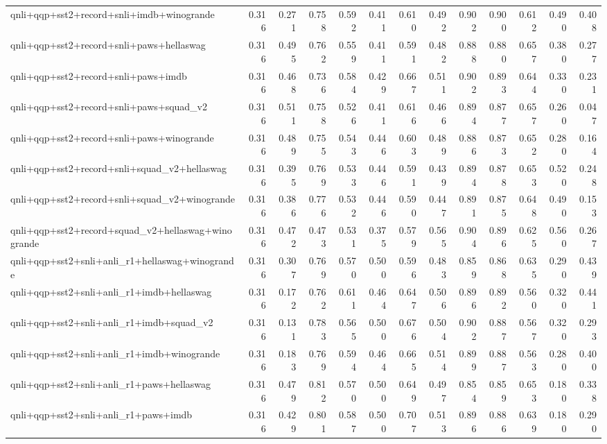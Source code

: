 \begin{table}[t]
\begin{tabular}{lrrrrrrrrrrrr}
    qnli+qqp+sst2+record+snli+imdb+winogrande & 0.316 & 0.271 & 0.758 & 0.592 & 0.411 & 0.610 & 0.492 & 0.902 & 0.900 & 0.612 & 0.490 & 0.408 \\
    qnli+qqp+sst2+record+snli+paws+hellaswag & 0.316 & 0.495 & 0.762 & 0.559 & 0.411 & 0.591 & 0.482 & 0.888 & 0.880 & 0.657 & 0.380 & 0.277 \\
    qnli+qqp+sst2+record+snli+paws+imdb & 0.316 & 0.468 & 0.736 & 0.584 & 0.429 & 0.667 & 0.511 & 0.902 & 0.893 & 0.644 & 0.330 & 0.231 \\
    qnli+qqp+sst2+record+snli+paws+squad\_v2 & 0.316 & 0.511 & 0.758 & 0.526 & 0.411 & 0.616 & 0.466 & 0.894 & 0.877 & 0.657 & 0.260 & 0.047 \\
    qnli+qqp+sst2+record+snli+paws+winogrande & 0.316 & 0.489 & 0.755 & 0.543 & 0.446 & 0.603 & 0.489 & 0.886 & 0.873 & 0.652 & 0.280 & 0.164 \\
    qnli+qqp+sst2+record+snli+squad\_v2+hellaswag & 0.316 & 0.395 & 0.769 & 0.533 & 0.446 & 0.591 & 0.439 & 0.894 & 0.878 & 0.653 & 0.520 & 0.248 \\
    qnli+qqp+sst2+record+snli+squad\_v2+winogrande & 0.316 & 0.386 & 0.776 & 0.532 & 0.446 & 0.590 & 0.447 & 0.891 & 0.875 & 0.648 & 0.490 & 0.153 \\
    qnli+qqp+sst2+record+squad\_v2+hellaswag+winogrande & 0.316 & 0.472 & 0.473 & 0.531 & 0.375 & 0.579 & 0.565 & 0.904 & 0.896 & 0.625 & 0.560 & 0.267 \\
    qnli+qqp+sst2+snli+anli\_r1+hellaswag+winogrande & 0.316 & 0.307 & 0.769 & 0.570 & 0.500 & 0.596 & 0.483 & 0.859 & 0.868 & 0.635 & 0.290 & 0.439 \\
    qnli+qqp+sst2+snli+anli\_r1+imdb+hellaswag & 0.316 & 0.172 & 0.762 & 0.611 & 0.464 & 0.647 & 0.506 & 0.896 & 0.892 & 0.560 & 0.320 & 0.441 \\
    qnli+qqp+sst2+snli+anli\_r1+imdb+squad\_v2 & 0.316 & 0.131 & 0.783 & 0.565 & 0.500 & 0.676 & 0.504 & 0.902 & 0.887 & 0.567 & 0.320 & 0.293 \\
    qnli+qqp+sst2+snli+anli\_r1+imdb+winogrande & 0.316 & 0.183 & 0.769 & 0.594 & 0.464 & 0.665 & 0.514 & 0.899 & 0.887 & 0.563 & 0.280 & 0.400 \\
    qnli+qqp+sst2+snli+anli\_r1+paws+hellaswag & 0.316 & 0.479 & 0.812 & 0.570 & 0.500 & 0.649 & 0.497 & 0.854 & 0.859 & 0.653 & 0.180 & 0.338 \\
    qnli+qqp+sst2+snli+anli\_r1+paws+imdb & 0.316 & 0.429 & 0.801 & 0.587 & 0.500 & 0.707 & 0.513 & 0.896 & 0.886 & 0.639 & 0.180 & 0.290 \\

\end{tabular}
\end{table}
